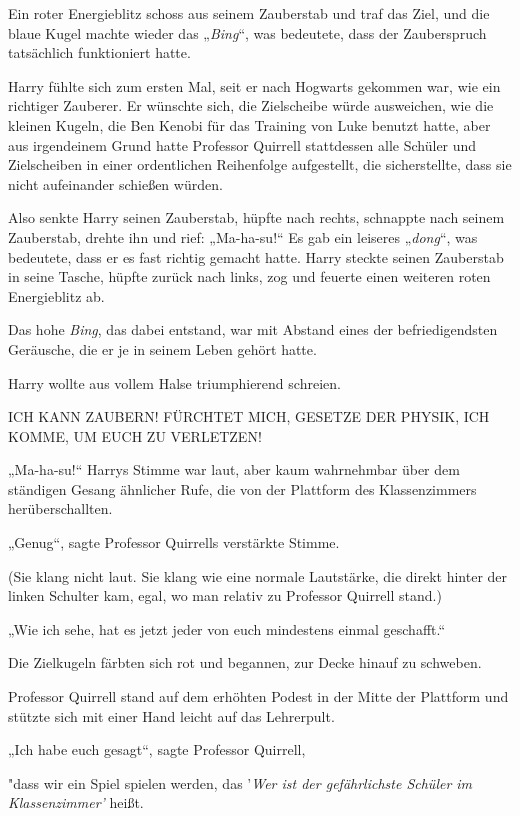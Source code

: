 {Ein roter Energieblitz schoss aus seinem Zauberstab und traf das Ziel, und die blaue Kugel machte wieder das „\emph{Bing}“, was bedeutete, dass der Zauberspruch tatsächlich funktioniert hatte.

Harry fühlte sich zum ersten Mal, seit er nach Hogwarts gekommen war, wie ein richtiger Zauberer. Er wünschte sich, die Zielscheibe würde ausweichen, wie die kleinen Kugeln, die Ben Kenobi für das Training von Luke benutzt hatte, aber aus irgendeinem Grund hatte Professor Quirrell stattdessen alle Schüler und Zielscheiben in einer ordentlichen Reihenfolge aufgestellt, die sicherstellte, dass sie nicht aufeinander schießen würden.

Also senkte Harry seinen Zauberstab, hüpfte nach rechts, schnappte nach seinem Zauberstab, drehte ihn und rief: „Ma-ha-su!“ Es gab ein leiseres „\emph{dong}“, was bedeutete, dass er es fast richtig gemacht hatte. Harry steckte seinen Zauberstab in seine Tasche, hüpfte zurück nach links, zog und feuerte einen weiteren roten Energieblitz ab.

Das hohe \emph{Bing}, das dabei entstand, war mit Abstand eines der befriedigendsten Geräusche, die er je in seinem Leben gehört hatte.

Harry wollte aus vollem Halse triumphierend schreien.

ICH KANN ZAUBERN! FÜRCHTET MICH, GESETZE DER PHYSIK, ICH KOMME, UM EUCH ZU VERLETZEN!

„Ma-ha-su!“ Harrys Stimme war laut, aber kaum wahrnehmbar über dem ständigen Gesang ähnlicher Rufe, die von der Plattform des Klassenzimmers herüberschallten.

„Genug“, sagte Professor Quirrells verstärkte Stimme.

(Sie klang nicht laut. Sie klang wie eine normale Lautstärke, die direkt hinter der linken Schulter kam, egal, wo man relativ zu Professor Quirrell stand.)

„Wie ich sehe, hat es jetzt jeder von euch mindestens einmal geschafft.“

Die Zielkugeln färbten sich rot und begannen, zur Decke hinauf zu schweben.

Professor Quirrell stand auf dem erhöhten Podest in der Mitte der Plattform und stützte sich mit einer Hand leicht auf das Lehrerpult.

„Ich habe euch gesagt“, sagte Professor Quirrell,

"dass wir ein Spiel spielen werden, das '\emph{Wer ist der gefährlichste Schüler im Klassenzimmer'} heißt.

}
